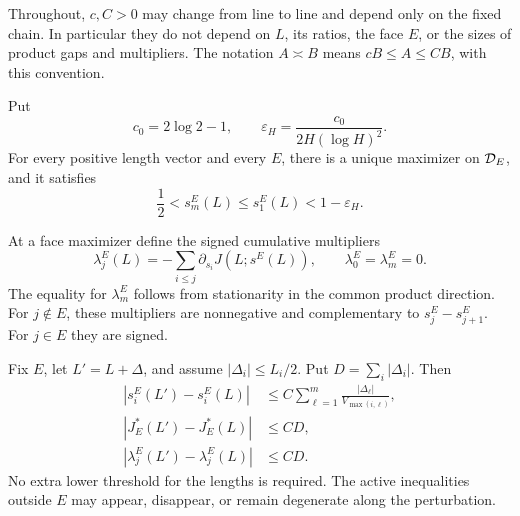 Throughout, \(c,C>0\) may change from line to line and depend only on
the fixed chain.  In particular they do not depend on \(L\), its ratios,
the face \(E\), or the sizes of product gaps and multipliers.  The notation
\(A\asymp B\) means \(cB\le A\le CB\), with this convention.

\begin{theorem}\label{geom:thm:global}
Put
\begin{equation}
 c_0=2\log2-1,\qquad
 \varepsilon_H=\frac{c_0}{2H(\log H)^2}.             \label{geom:eq:epsilon}
\end{equation}
For every positive length vector and every \(E\), there is a unique
maximizer on \(\mathcal D_E\), and it satisfies
\begin{equation}
 \frac12<s_m^E(L)\le s_1^E(L)<1-\varepsilon_H.
                                                        \label{geom:eq:outer}
\end{equation}
\end{theorem}

At a face maximizer define the signed cumulative multipliers
\begin{equation}
 \lambda_j^E(L)=-\sum_{i\le j}\partial_{s_i}J(L;s^E(L)),
 \qquad \lambda_0^E=\lambda_m^E=0.                 \label{geom:eq:lambda}
\end{equation}
The equality for \(\lambda_m^E\) follows from stationarity in the common
product direction.  For \(j\notin E\), these multipliers are nonnegative
and complementary to \(s_j^E-s_{j+1}^E\).  For \(j\in E\) they are signed.

\begin{theorem}\label{geom:thm:stability}
Fix \(E\), let \(L'=L+\Delta\), and assume
\(|\Delta_i|\le L_i/2\).  Put \(D=\sum_i|\Delta_i|\).  Then
\begin{align}
 |s_i^E(L')-s_i^E(L)|
   &\le C\sum_{\ell=1}^m
                \frac{|\Delta_\ell|}{V_{\max(i,\ell)}},   \label{geom:eq:stability}\\
 |J_E^*(L')-J_E^*(L)|&\le CD,                           \label{geom:eq:value}\\
 |\lambda_j^E(L')-\lambda_j^E(L)|&\le CD.                \label{geom:eq:multiplier}
\end{align}
No extra lower threshold for the lengths is required.  The active
inequalities outside \(E\) may appear, disappear, or remain degenerate
along the perturbation.
\end{theorem}

